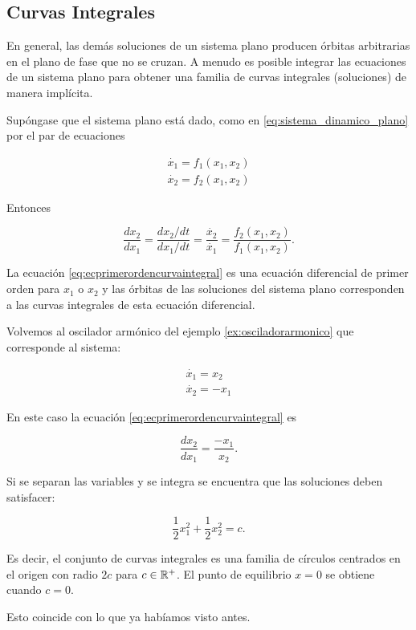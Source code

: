 \subsection{Curvas Integrales}

En general, las demás soluciones de un sistema plano producen órbitas arbitrarias en el plano de fase que no se cruzan.
A menudo es posible integrar las ecuaciones de un sistema plano para obtener una familia de curvas integrales (soluciones) de manera implícita.

Supóngase que el sistema plano está dado, como en \ref{eq:sistema_dinamico_plano} por el par de ecuaciones

$$
\begin{array}{l}
	\dot{x_1} = f_1(x_1,x_2) \\
	\dot{x_2} = f_2(x_1,x_2)
\end{array}
$$

Entonces

\begin{equation} \label{eq:ecprimerordencurvaintegral}
	\dfrac{dx_2}{dx_1} = \frac{dx_2/dt}{dx_1/dt} = \frac{\dot{x_2}}{\dot{x_1}} = \dfrac{f_2(x_1,x_2)}{f_1(x_1,x_2)}.
\end{equation}

La ecuación \ref{eq:ecprimerordencurvaintegral} es una ecuación diferencial de primer orden para $x_1$ o $x_2$ y las órbitas de las soluciones del sistema plano corresponden a las curvas integrales de esta ecuación diferencial.

\begin{example}
Volvemos al oscilador armónico del ejemplo \ref{ex:osciladorarmonico} que corresponde al sistema:

$$
\begin{array}{l}
	\dot{x_1} = x_2 \\
	\dot{x_2} = -x_1
\end{array}
$$

En este caso la ecuación \ref{eq:ecprimerordencurvaintegral} es

$$ \dfrac{dx_2}{dx_1} = \frac{-x_1}{x_2}.$$

Si se separan las variables y se integra se encuentra que las soluciones deben satisfacer:

$$ \frac{1}{2}x_1^2 + \frac{1}{2}x_2^2 = c.$$

Es decir, el conjunto de curvas integrales es una familia de círculos centrados en el origen con radio $2c$ para $c \in {\ensuremath{\mathbb{R}}}^+$. El punto de equilibrio $x = 0$ se obtiene cuando $c = 0$.

Esto coincide con lo que ya habíamos visto antes.
\end{example}



